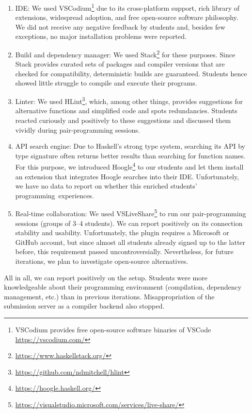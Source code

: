 \begin{enumerate}
  \item IDE: We used VSCodium\footnote{VSCodium provides free open-source software binaries of VSCode \url{https://vscodium.com/}} due to its cross-platform support,
    rich library of extensions,
    widespread adoption,
    and free open-source software philosophy.
    We did not receive any negative feedback by students
    and, besides few exceptions, no major installation problems were reported.
  \item Build and dependency manager: We used Stack\footnote{\url{https://www.haskellstack.org/}} for these purposes.
    Since Stack provides curated sets of packages and compiler versions that are checked for compatibility,
    deterministic builds are guaranteed.
    Students hence showed little struggle to compile and execute their programs.
  \item Linter: We used HLint\footnote{\url{https://github.com/ndmitchell/hlint}}, which, among other things,
    provides suggestions for alternative functions
    and simplified code and spots redundancies.
    Students reacted curiously and positively to these suggestions
    and discussed them vividly during pair-programming sessions.
  \item API search engine: Due to Haskell's strong type system,
    searching its API by type signature often returns better results than searching for function names.
    For this purpose, we introduced Hoogle\footnote{\url{https://hoogle.haskell.org/}} to our students and let them install an extension that integrates Hoogle searches into their IDE.
    Unfortunately, we have no data to report on whether this enriched students' programming~experiences.
  \item Real-time collaboration: We used VSLiveShare\footnote{\url{https://visualstudio.microsoft.com/services/live-share/}} to run our pair-programming sessions (groups of 3--4 students).
    We can report positively on its connection stability and usability.
    Unfortunately, the plugin requires a Microsoft or GitHub account,
    but since almost all students
    already signed up to the latter before,
    this requirement passed uncontroversially.
    Nevertheless, for future iterations,
    we plan to investigate open-source alternatives.
\end{enumerate}
All in all, we can report positively on the setup.
Students were more knowledgeable
about their programming environment (compilation, dependency management, etc.) than in previous iterations.
Misappropriation of the submission server as a compiler backend also stopped.
